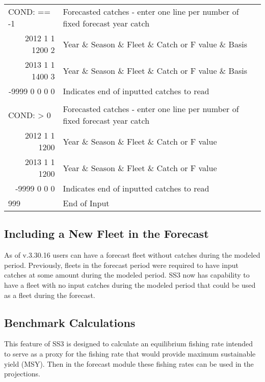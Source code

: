 \begin{landscape}
{\begin{longtable}{p{3.2cm} p{7cm} p{10.8cm}}
  \hline
  \multicolumn{1}{l}{COND: == -1 }& \multicolumn{2}{l}{Forecasted catches - enter one line per number of fixed forecast year catch} \Tstrut\\
  \multicolumn{1}{r}{2012 1 1 1200 2}  & \multicolumn{2}{l}{Year \& Season \& Fleet \& Catch or F value \& Basis}  \\
  \multicolumn{1}{r}{2013 1 1 1400 3}  & \multicolumn{2}{l}{Year \& Season \& Fleet \& Catch or F value \& Basis}  \\
  \multicolumn{1}{r}{-9999 0 0 0 0}  & \multicolumn{2}{l}{Indicates end of inputted catches to read}  \Bstrut\\
  \\
  \multicolumn{1}{l}{COND: > 0 }& \multicolumn{2}{l}{Forecasted catches - enter one line per number of fixed forecast year catch }\Tstrut\\
  \multicolumn{1}{r}{2012  1 1 1200}  & \multicolumn{2}{l}{Year \& Season \& Fleet \& Catch or F value}  \\
  \multicolumn{1}{r}{2013  1 1 1200}  & \multicolumn{2}{l}{Year \& Season \& Fleet \& Catch or F value}  \\
  \multicolumn{1}{r}{-9999 0 0 0}  & \multicolumn{2}{l}{Indicates end of inputted catches to read}  \Bstrut\\
  
  \hline
  999 & End of Input & \Bstrut\\

  \end{longtable}}  
\end{landscape}

\subsection{Including a New Fleet in the Forecast}
As of v.3.30.16 users can have a forecast fleet without catches during the modeled period. Previously, fleets in the forecast period were required to have input catches at some amount during the modeled period. SS3 now has capability to have a fleet with no input catches during the modeled period that could be used as a fleet during the forecast.

\hypertarget{Benchmark}{}
\subsection{Benchmark Calculations}
This feature of SS3 is designed to calculate an equilibrium fishing rate intended to serve as a proxy for the fishing rate that would provide maximum sustainable yield (MSY).  Then in the forecast module these fishing rates can be used in the projections.

